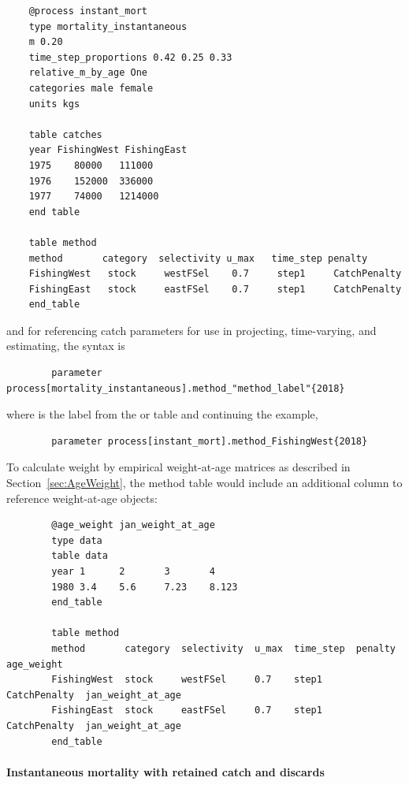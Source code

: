 
{\small{\begin{verbatim}
	@process instant_mort
	type mortality_instantaneous
	m 0.20
	time_step_proportions 0.42 0.25 0.33
	relative_m_by_age One
	categories male female
	units kgs

	table catches
	year FishingWest FishingEast
	1975	80000	111000
	1976	152000	336000
	1977	74000	1214000
	end table

	table method
	method       category  selectivity u_max   time_step penalty
	FishingWest   stock     westFSel    0.7     step1     CatchPenalty
	FishingEast   stock     eastFSel    0.7     step1     CatchPenalty
	end_table
	\end{verbatim}}}

and for referencing catch parameters for use in projecting, time-varying, and estimating, the syntax is

{\small{\begin{verbatim}
		parameter process[mortality_instantaneous].method_"method_label"{2018}
\end{verbatim}}}

where  is the label from the  or  table and continuing the example,

{\small{\begin{verbatim}
		parameter process[instant_mort].method_FishingWest{2018}
\end{verbatim}}}

To calculate weight by empirical weight-at-age matrices as described in Section~\ref{sec:AgeWeight}, the method table would include an additional column to reference weight-at-age objects:

{\small{\begin{verbatim}
		@age_weight jan_weight_at_age
		type data
		table data
		year 1 		2 		3 		4
		1980 3.4	5.6		7.23 	8.123
		end_table

		table method
		method       category  selectivity  u_max  time_step  penalty       age_weight
		FishingWest  stock     westFSel     0.7    step1      CatchPenalty  jan_weight_at_age
		FishingEast  stock     eastFSel     0.7    step1      CatchPenalty  jan_weight_at_age
		end_table
\end{verbatim}}}


\paragraph{Instantaneous mortality with retained catch and discards}\label{sec:Process-MortalityInstantaneousRetained}

